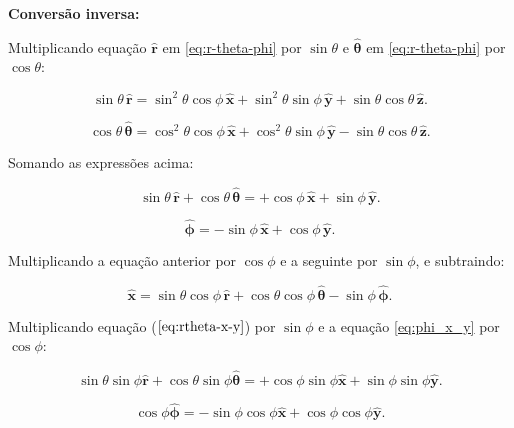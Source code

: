 \documentclass[a4paper,12pt]{article}
\begin{document}
\textbf{Conversão inversa:} 

Multiplicando equação $\hat{\mathbf{r}}$ em  \ref{eq:r-theta-phi} por $\sin\theta$ e $\hat{\bm{\theta}}$ em \ref{eq:r-theta-phi} por $\cos\theta$:

\begin{equation}
\sin\theta \, \hat{\mathbf{r}} = \sin^2\theta \cos\phi \, \hat{\mathbf{x}} + \sin^2\theta \sin\phi \, \hat{\mathbf{y}} + \sin\theta \cos\theta \, \hat{\mathbf{z}}.
\end{equation}

\begin{equation}
\cos\theta \, \hat{\bm{\theta}} = \cos^2\theta \cos\phi \, \hat{\mathbf{x}} + \cos^2\theta \sin\phi \, \hat{\mathbf{y}} - \sin\theta \cos\theta \, \hat{\mathbf{z}}.
\end{equation}

Somando as expressões acima:

\begin{equation}\label{eq:rtheta-x-y}
\sin\theta \, \hat{\mathbf{r}} + \cos\theta \, \hat{\bm{\theta}} = +\cos\phi \, \hat{\mathbf{x}} + \sin\phi \, \hat{\mathbf{y}}.
\end{equation}

\begin{equation}\label{eq:phi_x_y}
\hat{\bm{\phi}} = -\sin\phi \, \hat{\mathbf{x}} + \cos\phi \, \hat{\mathbf{y}}.
\end{equation}

Multiplicando a equação anterior por \(\cos\phi\) e a seguinte por \(\sin\phi\), e subtraindo:

\begin{equation}
\hat{\mathbf{x}} = \sin\theta \cos\phi \, \hat{\mathbf{r}} + \cos\theta \cos\phi \, \hat{\bm{\theta}} - \sin\phi \, \hat{\bm{\phi}}.
\end{equation}

Multiplicando equação ($\ref{eq:rtheta-x-y}$) por \(\sin\phi\) e a equação \ref{eq:phi_x_y} por \(\cos\phi\):

\begin{equation}\label{r_theta_x_y}
\sin\theta \sin\phi \hat{\mathbf{r}} + \cos\theta \sin\phi \hat{\bm{\theta}} = +\cos\phi \sin\phi \hat{\mathbf{x}} + \sin\phi \sin\phi \hat{\mathbf{y}}.
\end{equation}
    
\begin{equation}\label{theta_xy}
\cos\phi\hat{\bm{\phi}} = -\sin\phi \cos\phi \hat{\mathbf{x}} + \cos\phi \cos\phi \hat{\mathbf{y}}.
\end{equation}
\end{document}
